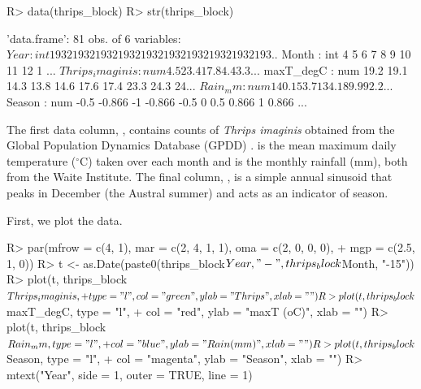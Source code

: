 \documentclass[article]{jss}
\begin{document}
\begin{Schunk}
\begin{Sinput}
R> data(thrips_block)
R> str(thrips_block)
\end{Sinput}
\begin{Soutput}
'data.frame':	81 obs. of  6 variables:
 $ Year           : int  1932 1932 1932 1932 1932 1932 1932 1932 1932 193..
 $ Month          : int  4 5 6 7 8 9 10 11 12 1 ...
 $ Thrips_imaginis: num  4.5 23.4 17.8 4.4 3.3 ...
 $ maxT_degC      : num  19.2 19.1 14.3 13.8 14.6 17.6 17.4 23.3 24.3 24...
 $ Rain_mm        : num  140.1 53.7 134.1 89.9 92.2 ...
 $ Season         : num  -0.5 -0.866 -1 -0.866 -0.5 0 0.5 0.866 1 0.866 ...
\end{Soutput}
\end{Schunk}

The first data column, , contains counts of \emph{Thrips imaginis} obtained from the Global Population Dynamics Database (GPDD) \citep{NERC-Centre-for-Population-Biology_2010}.  is the mean maximum daily temperature ($^\circ$C) taken over each month and  is the monthly rainfall (mm), both from the Waite Institute. The final column, , is a simple annual sinusoid that peaks in December (the Austral summer) and acts as an indicator of season.

First, we plot the data.

\begin{Schunk}
\begin{Sinput}
R> par(mfrow = c(4, 1), mar = c(2, 4, 1, 1), oma = c(2, 0, 0, 0),
+      mgp = c(2.5, 1, 0))
R> t <- as.Date(paste0(thrips_block$Year, "-", thrips_block$Month, "-15"))
R> plot(t, thrips_block$Thrips_imaginis, 
+       type = "l", col = "green", ylab = "Thrips", xlab = "")
R> plot(t, thrips_block$maxT_degC, type = "l", 
+       col = "red", ylab = "maxT (oC)", xlab = "")
R> plot(t, thrips_block$Rain_mm, type = "l", 
+       col = "blue", ylab = "Rain (mm)", xlab = "")
R> plot(t, thrips_block$Season, type = "l", 
+       col = "magenta", ylab = "Season", xlab = "")
R> mtext("Year", side = 1, outer = TRUE, line = 1)
\end{Sinput}
\end{Schunk}
\end{document}
